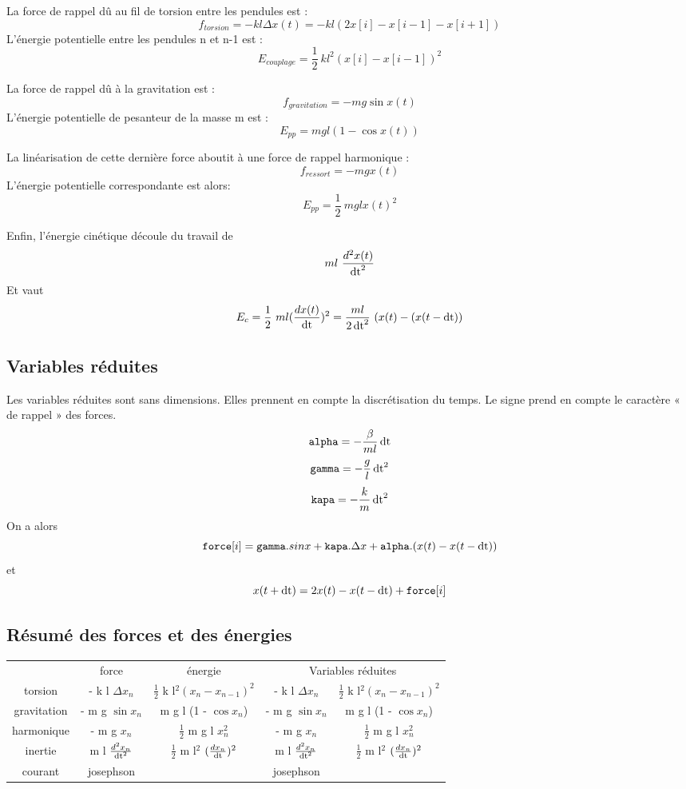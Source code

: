 La force de rappel dû au fil de torsion entre les pendules est :
%
\[
f_{torsion} = -  k l \Delta x(t) = -  k l (2x[i]-x[i-1]-x[i+1])
\]
%
L'énergie potentielle entre les pendules n et n-1 est :
\[
E_{couplage} = \frac{1}{2}\ k l^2 (x[i]-x[i-1])^2
\]

La force de rappel dû à la gravitation est :
%
\[
f_{gravitation} = - m g \sin{x(t)}
\]
L'énergie potentielle de pesanteur de la masse m est :
\[
E_{pp} = m g l (1 - \cos{x(t)})
\]

La linéarisation de cette dernière force aboutit à une force de rappel harmonique :
\[
f_{ressort} = - m g x(t)
\]
L'énergie potentielle correspondante est alors:
\[
E_{pp} = \frac{1}{2}\ m g l x(t)^2
\]

Enfin, l'énergie cinétique découle du travail de 
\[
m l\ \frac{d^2 x(t)}{\operatorname{dt}^2}
\]
%
Et vaut
\[
E_{c} = \frac{1}{2}\ m l (\frac{d x(t)}{\operatorname{dt}})^2 = \frac{m l}{2\operatorname{dt} ^2}\  (x(t)-(x(t-\operatorname{dt}))
\]

%
\subsection{Variables réduites}
%
Les variables réduites sont sans dimensions. Elles prennent en compte la discrétisation du temps. Le signe prend en compte le caractère « de rappel » des forces.
%
\[
\texttt{alpha} =  - \frac{\beta}{ml}\operatorname{dt}
\]
\[
\texttt{gamma} =  - \frac{g}{l}\operatorname{dt}^2
\]
\[
\texttt{kapa} =  - \frac{k}{m}\operatorname{dt}^2
\]
On a alors
\[
	\texttt{force}[i] = \texttt{gamma}.sinx + \texttt{kapa}. \Delta x + \texttt{alpha}.(x(t)-x(t-\operatorname{dt}))
\]
et
\[
	x(t+\operatorname{dt}) = 2 x(t) - x(t-\operatorname{dt}) + \texttt{force}[i]
\]


\subsection{Résumé des forces et des énergies}
\begin{center}
\begin{tabular}{ccccc}
 & force & énergie  & \multicolumn{2}{c}{Variables réduites} \\
torsion & -  k l $\Delta x_n$ & $\frac{1}{2}$ k l$^2 (x_n-x_{n-1})^2$  & -  k l $\Delta x_n$ & $\frac{1}{2}$ k l$^2 (x_n-x_{n-1})^2$ \\
gravitation & - m g $\sin{x_n}$ & m g l (1 - $\cos{x_n}$)  & - m g $\sin{x_n}$ & m g l (1 - $\cos{x_n}$) \\
harmonique & - m g $x_n$ & $\frac{1}{2}$ m g l $x_n^2$  & - m g $x_n$ & $\frac{1}{2}$ m g l $x_n^2$ \\
inertie & m l $\frac{d^2 x_n}{\operatorname{dt}^2}$ & $\frac{1}{2}$ m l$^2$ $(\frac{d x_n}{\operatorname{dt}})^2$  & m l $\frac{d^2 x_n}{\operatorname{dt}^2}$ & $\frac{1}{2}$ m l$^2$ $(\frac{d x_n}{\operatorname{dt}})^2$ \\
courant & josephson &  & josephson & \\
\end{tabular}
\end{center}
%

